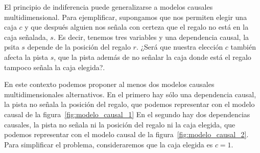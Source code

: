 \documentclass[a4paper,10pt]{book}
\theoremstyle{definition}
\begin{document}

El principio de indiferencia puede generalizarse a modelos causales multidimensional.
%
Para ejemplificar, supongamos que nos permiten elegir una caja $c$ y que después alguien nos señala con certeza que el regalo no está en la caja señalada, $s$.
%
Es decir, tenemos tres variables y una dependencia causal, la psita $s$ depende de la posición del regalo $r$.
%
¿Será que nuestra elección $c$ también afecta la pista $s$, que la pista además de no señalar la caja donde está el regalo tampoco señala la caja elegida?.


En este contexto podemos proponer al menos dos modelos causales multidimensionales alternativos.
%
En el primero hay sólo una dependencia causal, la pista no señala la posición del regalo, que podemos representar con el modelo causal de la figura~\ref{fig:modelo_causal_1}
%
En el segundo hay dos dependencias causales, la pista no señala ni la posición del regalo ni la caja elegida, que podemos representar con el modelo causal de la figura~\ref{fig:modelo_causal_2}.
%
Para simplificar el problema, consideraremos que la caja elegida es $c=1$.

\end{document}
